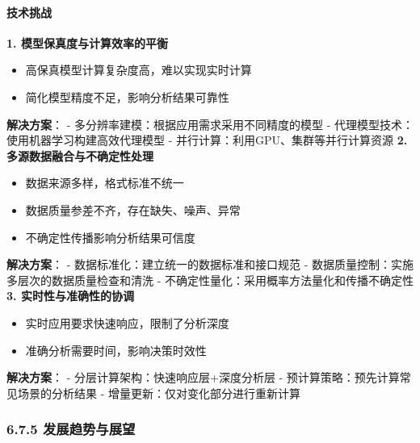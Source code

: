 {{{{{{{{{{\paragraph{技术挑战}\label{ux6280ux672fux6311ux6218} \textbf{1. 模型保真度与计算效率的平衡} \begin{itemize} \tightlist \item
高保真模型计算复杂度高，难以实现实时计算 \item 简化模型精度不足，影响分析结果可靠性 \end{itemize} \textbf{解决方案}： - 多分辨率建模：根据应用需求采用不同精度的模型 -
代理模型技术：使用机器学习构建高效代理模型 - 并行计算：利用GPU、集群等并行计算资源 \textbf{2. 多源数据融合与不确定性处理} \begin{itemize} \tightlist \item 数据来源多样，格式标准不统一
\item 数据质量参差不齐，存在缺失、噪声、异常 \item 不确定性传播影响分析结果可信度 \end{itemize} \textbf{解决方案}： - 数据标准化：建立统一的数据标准和接口规范 -
数据质量控制：实施多层次的数据质量检查和清洗 - 不确定性量化：采用概率方法量化和传播不确定性 \textbf{3. 实时性与准确性的协调} \begin{itemize} \tightlist \item
实时应用要求快速响应，限制了分析深度 \item 准确分析需要时间，影响决策时效性 \end{itemize} \textbf{解决方案}： - 分层计算架构：快速响应层+深度分析层 - 预计算策略：预先计算常见场景的分析结果 -
增量更新：仅对变化部分进行重新计算 \subsubsection{6.7.5 发展趋势与展望}\label{ux53d1ux5c55ux8d8bux52bfux4e0eux5c55ux671b}
}}}}}}}}}}
